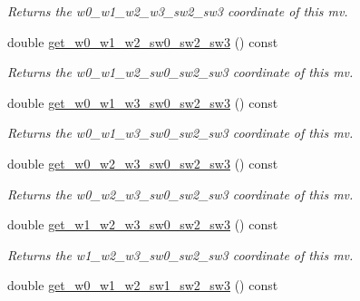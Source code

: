 \begin{DoxyCompactItemize}
\begin{DoxyCompactList}\small\item\em Returns the w0\-\_\-w1\-\_\-w2\-\_\-w3\-\_\-sw2\-\_\-sw3 coordinate of this mv. \end{DoxyCompactList}\item 
\hypertarget{classe3ga_1_1mv_a4964c83c116435036af7d4a909ec22ff}{double \hyperlink{classe3ga_1_1mv_a4964c83c116435036af7d4a909ec22ff}{get\-\_\-w0\-\_\-w1\-\_\-w2\-\_\-sw0\-\_\-sw2\-\_\-sw3} () const }\label{classe3ga_1_1mv_a4964c83c116435036af7d4a909ec22ff}

\begin{DoxyCompactList}\small\item\em Returns the w0\-\_\-w1\-\_\-w2\-\_\-sw0\-\_\-sw2\-\_\-sw3 coordinate of this mv. \end{DoxyCompactList}\item 
\hypertarget{classe3ga_1_1mv_aa6312b3bb67e8a57e47e1cf9b496cb5c}{double \hyperlink{classe3ga_1_1mv_aa6312b3bb67e8a57e47e1cf9b496cb5c}{get\-\_\-w0\-\_\-w1\-\_\-w3\-\_\-sw0\-\_\-sw2\-\_\-sw3} () const }\label{classe3ga_1_1mv_aa6312b3bb67e8a57e47e1cf9b496cb5c}

\begin{DoxyCompactList}\small\item\em Returns the w0\-\_\-w1\-\_\-w3\-\_\-sw0\-\_\-sw2\-\_\-sw3 coordinate of this mv. \end{DoxyCompactList}\item 
\hypertarget{classe3ga_1_1mv_a27183243df25edbc6af9483d50f41ac5}{double \hyperlink{classe3ga_1_1mv_a27183243df25edbc6af9483d50f41ac5}{get\-\_\-w0\-\_\-w2\-\_\-w3\-\_\-sw0\-\_\-sw2\-\_\-sw3} () const }\label{classe3ga_1_1mv_a27183243df25edbc6af9483d50f41ac5}

\begin{DoxyCompactList}\small\item\em Returns the w0\-\_\-w2\-\_\-w3\-\_\-sw0\-\_\-sw2\-\_\-sw3 coordinate of this mv. \end{DoxyCompactList}\item 
\hypertarget{classe3ga_1_1mv_a461aed7e2e913342f1a7756203f3e652}{double \hyperlink{classe3ga_1_1mv_a461aed7e2e913342f1a7756203f3e652}{get\-\_\-w1\-\_\-w2\-\_\-w3\-\_\-sw0\-\_\-sw2\-\_\-sw3} () const }\label{classe3ga_1_1mv_a461aed7e2e913342f1a7756203f3e652}

\begin{DoxyCompactList}\small\item\em Returns the w1\-\_\-w2\-\_\-w3\-\_\-sw0\-\_\-sw2\-\_\-sw3 coordinate of this mv. \end{DoxyCompactList}\item 
\hypertarget{classe3ga_1_1mv_ac0c0b6542f8118086c78bf656e54d83b}{double \hyperlink{classe3ga_1_1mv_ac0c0b6542f8118086c78bf656e54d83b}{get\-\_\-w0\-\_\-w1\-\_\-w2\-\_\-sw1\-\_\-sw2\-\_\-sw3} () const }\label{classe3ga_1_1mv_ac0c0b6542f8118086c78bf656e54d83b}


\end{DoxyCompactItemize}
